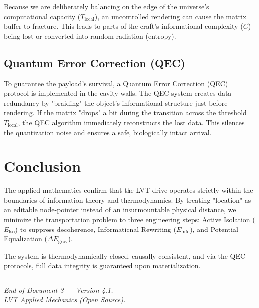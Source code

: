 \documentclass[12pt,a4paper]{article}
\begin{document}
Because we are deliberately balancing on the edge of the universe's computational capacity ($T_{\mathrm{local}}$), an uncontrolled rendering can cause the matrix buffer to fracture. This leads to parts of the craft's informational complexity ($C$) being lost or converted into random radiation (entropy).

\subsection{Quantum Error Correction (QEC)}
To guarantee the payload's survival, a Quantum Error Correction (QEC) protocol is implemented in the cavity walls. The QEC system creates data redundancy by "braiding" the object's informational structure just before rendering. If the matrix "drops" a bit during the transition across the threshold $T_{\mathrm{local}}$, the QEC algorithm immediately reconstructs the lost data. This silences the quantization noise and ensures a safe, biologically intact arrival.

\section{Conclusion}

The applied mathematics confirm that the LVT drive operates strictly within the boundaries of information theory and thermodynamics. By treating "location" as an editable node-pointer instead of an insurmountable physical distance, we minimize the transportation problem to three engineering steps: Active Isolation ($E_{\text{iso}}$) to suppress decoherence, Informational Rewriting ($E_{\text{info}}$), and Potential Equalization ($\Delta E_{\text{grav}}$).

The system is thermodynamically closed, causally consistent, and via the QEC protocols, full data integrity is guaranteed upon materialization.

\vspace{2em}
\hrule
\vspace{0.5em}
\begin{center}
\small\textit{End of Document 3 --- Version 4.1. \\
LVT Applied Mechanics (Open Source).}
\end{center}
\end{document}
